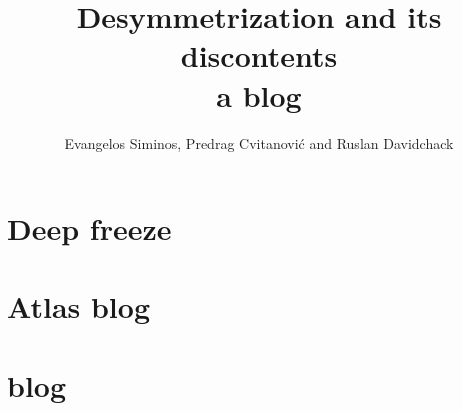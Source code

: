 \documentclass[10pt,openany]{book}
\title{Desymmetrization and its discontents
       \\ \Huge a blog}
\author{Evangelos Siminos,
        Predrag Cvitanovi\'{c} and
        Ruslan Davidchack}
\begin{document}
\maketitle

\tableofcontents






\chapter{Deep freeze}
\label{c-freeze}


    \newpage






% 



    \chapter{Atlas  blog}
    \label{chap:atlas}

    \chapter{{\twoMode} blog}
    \label{chap:2modes}







\newpage
% 
% 


\newpage

\end{document}
